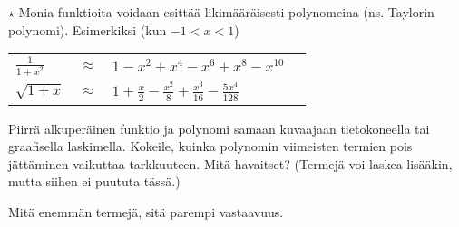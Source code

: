 \begin{tehtavasivu}
\begin{tehtava} $\star$
	Monia funktioita voidaan esittää likimääräisesti polynomeina (ns. Taylorin polynomi). Esimerkiksi (kun $-1<x<1$)

	\begin{tabular}{lcll}
	$\frac{1}{1+x^2}$ &$\approx$ & $1-x^2+x^4-x^6+x^8-x^{10}$ \\
	$\sqrt{1+x}$ & $\approx $ & $ 1+\frac{x}{2}
	-\frac{x^2}{8}+\frac{x^3}{16}-\frac{5x^4}{128}$
	\end{tabular}

	Piirrä alkuperäinen funktio ja polynomi samaan kuvaajaan tietokoneella tai graafisella laskimella. Kokeile, kuinka polynomin viimeisten termien pois jättäminen vaikuttaa tarkkuuteen. Mitä havaitset? (Termejä voi laskea lisääkin, mutta siihen ei puututa tässä.)
	\begin{vastaus}
		Mitä enemmän termejä, sitä parempi vastaavuus.
	\end{vastaus}
\end{tehtava}

\end{tehtavasivu}